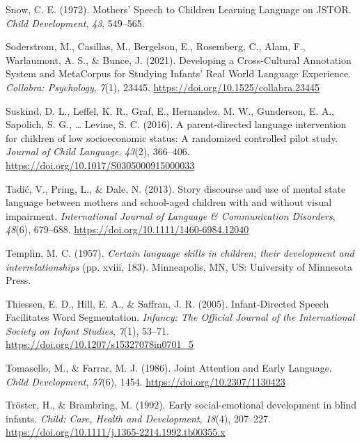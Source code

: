 \documentclass[
  man,floatsintext]{apa6}
\newlength{\cslhangindent}
\newlength{\cslentryspacingunit} %
\newenvironment{CSLReferences}[2] %
 {%
  \setlength{\parindent}{0pt}
  \ifodd #1
  \let\oldpar\par
  \def\par{\hangindent=\cslhangindent\oldpar}
  \fi
  \setlength{\parskip}{#2\cslentryspacingunit}
 }%
 {}
\begin{document}
\begin{CSLReferences}{1}{0}
\leavevmode{}%
Snow, C. E. (1972). Mothers' {Speech} to {Children Learning Language} on {JSTOR}. \emph{Child Development}, \emph{43}, 549--565.

\leavevmode{}%
Soderstrom, M., Casillas, M., Bergelson, E., Rosemberg, C., Alam, F., Warlaumont, A. S., \& Bunce, J. (2021). Developing a {Cross-Cultural Annotation System} and {MetaCorpus} for {Studying Infants}' {Real World Language Experience}. \emph{Collabra: Psychology}, \emph{7}(1), 23445. \url{https://doi.org/10.1525/collabra.23445}

\leavevmode{}%
Suskind, D. L., Leffel, K. R., Graf, E., Hernandez, M. W., Gunderson, E. A., Sapolich, S. G., \ldots{} Levine, S. C. (2016). A parent-directed language intervention for children of low socioeconomic status: A randomized controlled pilot study. \emph{Journal of Child Language}, \emph{43}(2), 366--406. \url{https://doi.org/10.1017/S0305000915000033}

\leavevmode{}%
Tadić, V., Pring, L., \& Dale, N. (2013). Story discourse and use of mental state language between mothers and school-aged children with and without visual impairment. \emph{International Journal of Language \& Communication Disorders}, \emph{48}(6), 679--688. \url{https://doi.org/10.1111/1460-6984.12040}

\leavevmode{}%
Templin, M. C. (1957). \emph{Certain language skills in children; their development and interrelationships} (pp. xviii, 183). Minneapolis, MN, US: University of Minnesota Press.

\leavevmode{}%
Thiessen, E. D., Hill, E. A., \& Saffran, J. R. (2005). Infant-{Directed Speech Facilitates Word Segmentation}. \emph{Infancy: The Official Journal of the International Society on Infant Studies}, \emph{7}(1), 53--71. \url{https://doi.org/10.1207/s15327078in0701_5}

\leavevmode{}%
Tomasello, M., \& Farrar, M. J. (1986). Joint {Attention} and {Early Language}. \emph{Child Development}, \emph{57}(6), 1454. \url{https://doi.org/10.2307/1130423}

\leavevmode{}%
Tröster, H., \& Brambring, M. (1992). Early social-emotional development in blind infants. \emph{Child: Care, Health and Development}, \emph{18}(4), 207--227. \url{https://doi.org/10.1111/j.1365-2214.1992.tb00355.x}


\end{CSLReferences}
\end{document}
